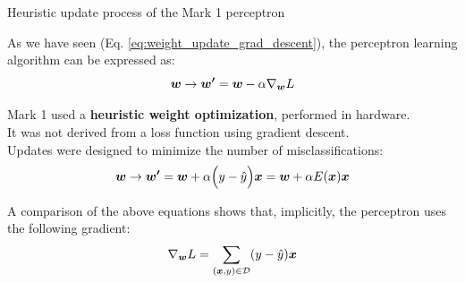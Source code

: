 \begin{frame}[t]{Heuristic update process of the Mark 1 perceptron}

    As we have seen (Eq. \ref{eq:weight_update_grad_descent}), 
    the \gls{perceptron} 
    learning algorithm can be expressed as:
    \begin{equation*}
        \boldsymbol{w} \rightarrow \boldsymbol{w^\prime} = \boldsymbol{w} - \alpha \nabla_{\boldsymbol{w}} L
    \end{equation*}

    Mark 1 used a {\bf heuristic weight optimization}, performed in hardware.\\
    It was not derived from a \gls{loss function} 
    using \gls{gradient descent}.\\
    \vspace{0.2cm} 
    Updates were designed to minimize the number of misclassifications:\\
    \begin{equation}
        \boldsymbol{w} \rightarrow \boldsymbol{w^\prime} = 
        \boldsymbol{w} + \alpha \Big(y - \hat{y}\Big) \boldsymbol{x} =
        \boldsymbol{w} + \alpha E(\boldsymbol{x}) \boldsymbol{x} 
        \label{eq:percepton_weight_update_1}
    \end{equation}

    A comparison of the above equations shows that, 
    implicitly, the \gls{perceptron} 
    uses the following gradient: 
    \begin{equation}
        \nabla_{\boldsymbol{w}} L = 
          \sum_{(\boldsymbol{x},y) \in \mathcal{D}} 
          (y - \hat{y}) \boldsymbol{x}
    \label{eq:percepton_smooth_gradient_1}  
    \end{equation}



\end{frame}



%
%
%

